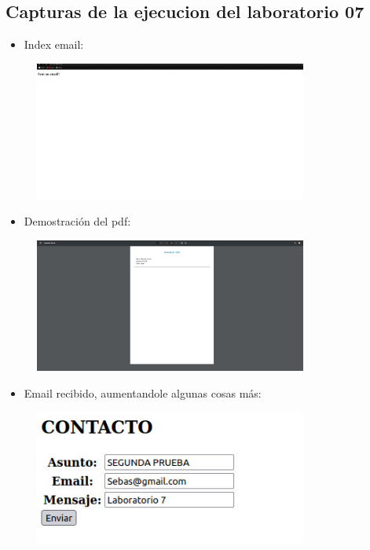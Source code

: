 \subsection{Capturas de la ejecucion del laboratorio 07}
\begin{itemize}	
	\item Index email:
\end{itemize}	
\begin{figure}[H]
	\centering
	\includegraphics[width=0.8\textwidth,keepaspectratio]{img/index.jpeg}
\end{figure}
\begin{itemize}	
	\item Demostración del pdf:
\end{itemize}	
\begin{figure}[H]
	\centering
	\includegraphics[width=0.8\textwidth,keepaspectratio]{img/pdf.jpeg}
\end{figure}
\begin{itemize}	
	\item Email recibido, aumentandole algunas cosas más:
\end{itemize}	
\begin{figure}[H]
	\centering
	\includegraphics[width=0.8\textwidth,keepaspectratio]{img/e3.jpeg}
\end{figure}
